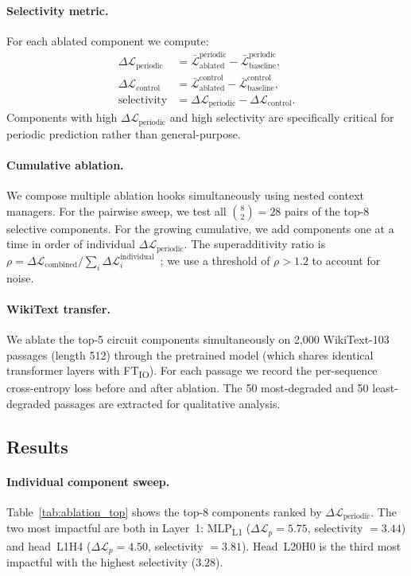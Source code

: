 \documentclass{article}
\begin{document}
\paragraph{Selectivity metric.}
For each ablated component we compute:
\begin{align}
\Delta\mathcal{L}_\text{periodic} &= \bar{\mathcal{L}}_\text{ablated}^\text{periodic} - \bar{\mathcal{L}}_\text{baseline}^\text{periodic}, \\
\Delta\mathcal{L}_\text{control} &= \bar{\mathcal{L}}_\text{ablated}^\text{control} - \bar{\mathcal{L}}_\text{baseline}^\text{control}, \\
\text{selectivity} &= \Delta\mathcal{L}_\text{periodic} - \Delta\mathcal{L}_\text{control}.
\end{align}
Components with high $\Delta\mathcal{L}_\text{periodic}$ and high selectivity are specifically critical for periodic prediction rather than general-purpose.

\paragraph{Cumulative ablation.}
We compose multiple ablation hooks simultaneously using nested context managers. For the pairwise sweep, we test all $\binom{8}{2} = 28$ pairs of the top-8 selective components. For the growing cumulative, we add components one at a time in order of individual $\Delta\mathcal{L}_\text{periodic}$. The superadditivity ratio is $\rho = \Delta\mathcal{L}_\text{combined} / \sum_i \Delta\mathcal{L}_i^\text{individual}$~\citep{conmy2023automated, elhage2021mathematical}; we use a threshold of $\rho > 1.2$ to account for noise.

\paragraph{WikiText transfer.}
We ablate the top-5 circuit components simultaneously on 2{,}000 WikiText-103 passages (length 512) through the pretrained model (which shares identical transformer layers with FT\textsubscript{IO}). For each passage we record the per-sequence cross-entropy loss before and after ablation. The 50 most-degraded and 50 least-degraded passages are extracted for qualitative analysis.

\subsection{Results}

\paragraph{Individual component sweep.}
Table~\ref{tab:ablation_top} shows the top-8 components ranked by $\Delta\mathcal{L}_\text{periodic}$. The two most impactful are both in Layer~1: MLP\textsubscript{L1} ($\Delta\mathcal{L}_p = 5.75$, selectivity $= 3.44$) and head~L1H4 ($\Delta\mathcal{L}_p = 4.50$, selectivity $= 3.81$). Head~L20H0 is the third most impactful with the highest selectivity ($3.28$).
\end{document}
